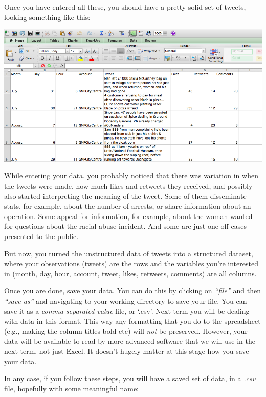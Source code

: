 \documentclass[
]{book}
\begin{document}
Once you have entered all these, you should have a pretty solid set of tweets, looking something like this:

\includegraphics{imgs/gmp_tweets.png}

While entering your data, you probably noticed that there was variation in when the tweets were made, how much likes and retweets they received, and possibly also started interpreting the meaning of the tweet. Some of them disseminate stats, for example, about the number of arrests, or share information about an operation. Some appeal for information, for example, about the woman wanted for questions about the racial abuse incident. And some are just one-off cases presented to the public.

But now, you turned the unstructured data of tweets into a structured dataset, where your observations (tweets) are the rows and the variables you're interested in (month, day, hour, account, tweet, likes, retweets, comments) are all columns.

Once you are done, save your data. You can do this by clicking on \emph{``file''} and then \emph{``save as''} and navigating to your working directory to save your file. You can save it as a \emph{comma separated value} file, or `.csv'. Next term you will be dealing with data in this format. This way any formatting that you do to the spreadsheet (e.g., making the column titles bold etc) will \emph{not} be preserved. However, your data will be available to read by more advanced software that we will use in the next term, not just Excel. It doesn't hugely matter at this stage how you save your data.

In any case, if you follow these steps, you will have a saved set of data, in a \emph{.csv} file, hopefully with some meaningful name:
\end{document}
